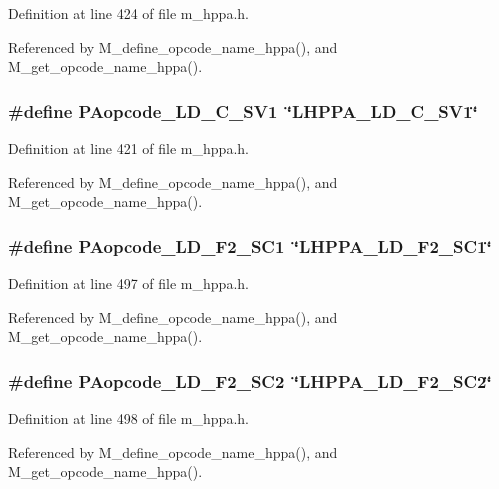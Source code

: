 Definition at line 424 of file m\_\-hppa.h.

Referenced by M\_\-define\_\-opcode\_\-name\_\-hppa(), and M\_\-get\_\-opcode\_\-name\_\-hppa().
\subsubsection{\setlength{\rightskip}{0pt plus 5cm}\#define PAopcode\_\-LD\_\-C\_\-SV1~\char`\"{}LHPPA\_\-LD\_\-C\_\-SV1\char`\"{}}\label{m__hppa_8h_e6ca01bbdf8f9aba5c764bbb7f92d8a7}




Definition at line 421 of file m\_\-hppa.h.

Referenced by M\_\-define\_\-opcode\_\-name\_\-hppa(), and M\_\-get\_\-opcode\_\-name\_\-hppa().
\subsubsection{\setlength{\rightskip}{0pt plus 5cm}\#define PAopcode\_\-LD\_\-F2\_\-SC1~\char`\"{}LHPPA\_\-LD\_\-F2\_\-SC1\char`\"{}}\label{m__hppa_8h_d0129ed61998a321e42efe4cadce85ec}




Definition at line 497 of file m\_\-hppa.h.

Referenced by M\_\-define\_\-opcode\_\-name\_\-hppa(), and M\_\-get\_\-opcode\_\-name\_\-hppa().
\subsubsection{\setlength{\rightskip}{0pt plus 5cm}\#define PAopcode\_\-LD\_\-F2\_\-SC2~\char`\"{}LHPPA\_\-LD\_\-F2\_\-SC2\char`\"{}}\label{m__hppa_8h_004582c2b57bb77ceb23c4ce28d292bf}




Definition at line 498 of file m\_\-hppa.h.

Referenced by M\_\-define\_\-opcode\_\-name\_\-hppa(), and M\_\-get\_\-opcode\_\-name\_\-hppa().
